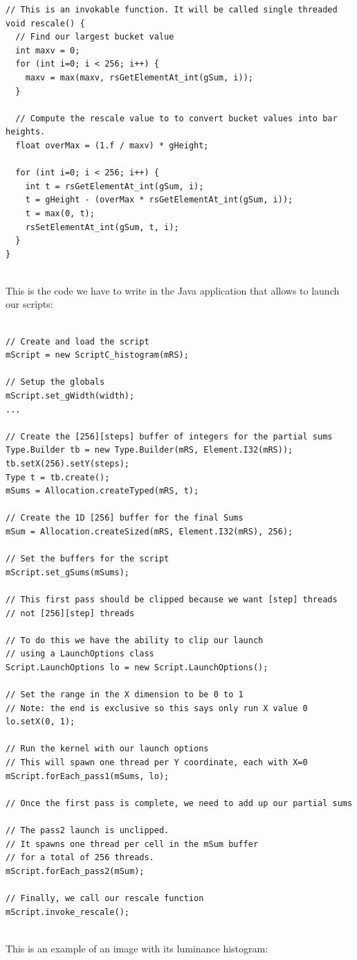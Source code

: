 \begin{lstlisting}[frame=single]
// This is an invokable function. It will be called single threaded
void rescale() {
  // Find our largest bucket value
  int maxv = 0;
  for (int i=0; i < 256; i++) {
    maxv = max(maxv, rsGetElementAt_int(gSum, i));
  }

  // Compute the rescale value to to convert bucket values into bar heights.
  float overMax = (1.f / maxv) * gHeight;

  for (int i=0; i < 256; i++) {
    int t = rsGetElementAt_int(gSum, i);
    t = gHeight - (overMax * rsGetElementAt_int(gSum, i));
    t = max(0, t);
    rsSetElementAt_int(gSum, t, i);
  }
}


\end{lstlisting}

\vspace{4ex}
This is the code we have to write in the Java application that allows to launch our scripts:

\begin{lstlisting}[frame=single]

// Create and load the script
mScript = new ScriptC_histogram(mRS);

// Setup the globals
mScript.set_gWidth(width);
...

// Create the [256][steps] buffer of integers for the partial sums
Type.Builder tb = new Type.Builder(mRS, Element.I32(mRS));
tb.setX(256).setY(steps);
Type t = tb.create();
mSums = Allocation.createTyped(mRS, t);

// Create the 1D [256] buffer for the final Sums
mSum = Allocation.createSized(mRS, Element.I32(mRS), 256);

// Set the buffers for the script
mScript.set_gSums(mSums);

// This first pass should be clipped because we want [step] threads
// not [256][step] threads

// To do this we have the ability to clip our launch
// using a LaunchOptions class
Script.LaunchOptions lo = new Script.LaunchOptions();

// Set the range in the X dimension to be 0 to 1
// Note: the end is exclusive so this says only run X value 0
lo.setX(0, 1);

// Run the kernel with our launch options
// This will spawn one thread per Y coordinate, each with X=0
mScript.forEach_pass1(mSums, lo);

// Once the first pass is complete, we need to add up our partial sums

// The pass2 launch is unclipped.
// It spawns one thread per cell in the mSum buffer
// for a total of 256 threads.
mScript.forEach_pass2(mSum);

// Finally, we call our rescale function
mScript.invoke_rescale();


\end{lstlisting}
\vspace{4ex}
This is an example of an image with its luminance histogram:

